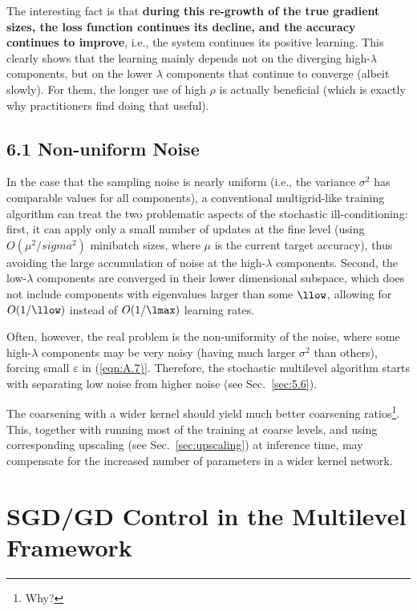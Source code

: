 \documentclass{article} %
\begin{document}
The interesting fact is that \textbf{during this re-growth of the true gradient sizes, the loss function continues its decline, and the accuracy continues to improve}, i.e., the system continues its positive learning. This clearly shows that the learning mainly depends not on the diverging high-$\lambda$ components, but on the lower $\lambda$ components that continue to converge (albeit slowly). For them, the longer use of high $\rho$ is actually beneficial (which is exactly why practitioners find doing that useful).

\subsection{6.1 Non-uniform Noise}
In the case that the sampling noise is nearly uniform (i.e., the variance $\sigma^2$ has comparable values for all components), a conventional multigrid-like training algorithm can treat the two problematic aspects of the stochastic ill-conditioning: first, it can apply only a small number of updates at the fine level (using $O(\mu^2/sigma^2)$ minibatch sizes, where $\mu$ is the current target accuracy), thus avoiding the large accumulation of noise at the high-$\lambda$ components. Second, the low-$\lambda$ components are converged in their lower dimensional subspace, which does not include components with eigenvalues larger than some $\llow$, allowing for $O(1/\llow)$ instead of $O(1/\lmax)$ learning rates.

Often, however, the real problem is the non-uniformity of the noise, where some high-$\lambda$ components may be very noisy (having much larger $\sigma^2$ than others), forcing small $\varepsilon$ in (\ref{eqn:A.7)}. Therefore, the stochastic multilevel algorithm starts with separating low noise from higher noise (see Sec.~\ref{sec:5.6}).

The coarsening with a wider kernel should yield much better coarsening ratios\footnote{Why?}. This, together with running most of the training at coarse levels, and using corresponding upscaling (see Sec.~\ref{sec:upscaling}) at inference time, may compensate for the increased number of parameters in a wider kernel network.


\section{SGD/GD Control in the Multilevel Framework}
\label{sec:control}
\end{document}

